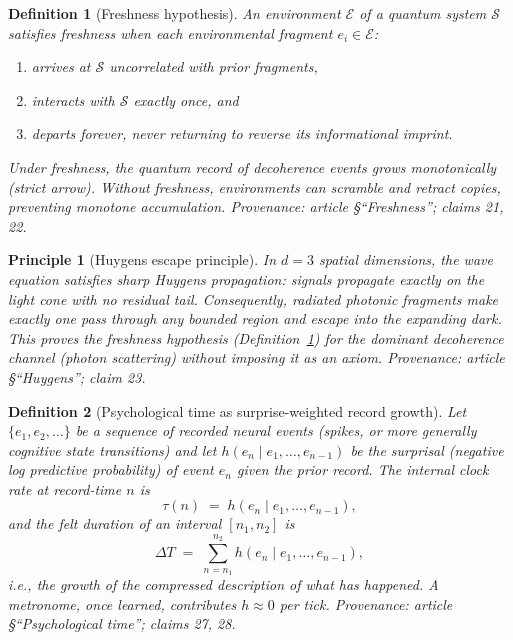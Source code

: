 \documentclass[11pt]{article}
\newtheorem{definition}{Definition}
\newtheorem{principle}{Principle}
\newcommand{\cE}{\mathcal{E}}
\newcommand{\cS}{\mathcal{S}}
\begin{document}
\begin{definition}[Freshness hypothesis]\label{def:freshness}
An environment $\cE$ of a quantum system $\cS$ satisfies \emph{freshness}
when each environmental fragment $e_i \in \cE$:
\begin{enumerate}
  \item arrives at $\cS$ uncorrelated with prior fragments,
  \item interacts with $\cS$ exactly once, and
  \item departs forever, never returning to reverse its informational imprint.
\end{enumerate}
Under freshness, the quantum record of decoherence events grows monotonically
(strict arrow).  Without freshness, environments can scramble and retract
copies, preventing monotone accumulation.
\emph{Provenance: article \S``Freshness''; claims 21, 22.}
\end{definition}

\begin{principle}[Huygens escape principle]\label{pr:huygens}
In $d = 3$ spatial dimensions, the wave equation satisfies \emph{sharp
Huygens propagation}: signals propagate exactly on the light cone with no
residual tail.  Consequently, radiated photonic fragments make exactly one
pass through any bounded region and escape into the expanding dark.  This
proves the freshness hypothesis (Definition~\ref{def:freshness}) for the
dominant decoherence channel (photon scattering) without imposing it as an
axiom.
\emph{Provenance: article \S``Huygens''; claim 23.}
\end{principle}

\begin{definition}[Psychological time as surprise-weighted record growth]\label{def:psych}
Let $\{e_1, e_2, \ldots\}$ be a sequence of recorded neural events (spikes,
or more generally cognitive state transitions) and let
$h(e_n \mid e_1, \ldots, e_{n-1})$ be the surprisal (negative log predictive
probability) of event $e_n$ given the prior record.  The \emph{internal clock
rate} at record-time $n$ is
\[
  \tau(n) \;=\; h(e_n \mid e_1, \ldots, e_{n-1}),
\]
and the \emph{felt duration} of an interval $[n_1, n_2]$ is
\[
  \Delta T \;=\; \sum_{n=n_1}^{n_2} h(e_n \mid e_1, \ldots, e_{n-1}),
\]
i.e., the growth of the compressed description of what has happened.
A metronome, once learned, contributes $h \approx 0$ per tick.
\emph{Provenance: article \S``Psychological time''; claims 27, 28.}
\end{definition}
\end{document}
